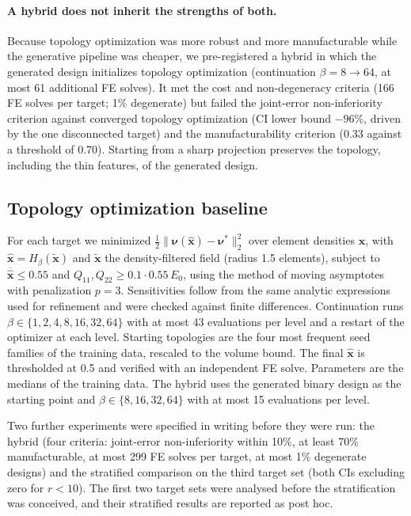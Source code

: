 \paragraph{A hybrid does not inherit the strengths of both.}
Because topology optimization was more robust and more manufacturable while
the generative pipeline was cheaper, we pre-registered a hybrid in which the
generated design initializes topology optimization (continuation
$\beta=8\to64$, at most 61 additional FE solves). It met the cost and
non-degeneracy criteria (166 FE solves per target; 1\% degenerate) but
failed the joint-error non-inferiority criterion against converged
topology optimization (CI lower bound $-96\%$, driven by the one
disconnected target) and the manufacturability criterion (0.33 against a
threshold of 0.70). Starting from a sharp projection preserves the topology,
including the thin features, of the generated design.

\subsection{Topology optimization baseline}
For each target we minimized
$\tfrac12\lVert\boldsymbol\nu(\hat{\mathbf x})-\boldsymbol\nu^{*}\rVert_2^2$
over element densities $\mathbf x$, with $\hat{\mathbf x}=H_\beta(\tilde{\mathbf x})$
and $\tilde{\mathbf x}$ the density-filtered field (radius 1.5 elements),
subject to $\overline{\hat{\mathbf x}}\le0.55$ and $Q_{11},Q_{22}\ge0.1\cdot0.55\,E_0$,
using the method of moving asymptotes \citep{svanberg1987mma} with penalization
$p=3$. Sensitivities follow from the same analytic expressions used for
refinement and were checked against finite differences. Continuation runs
$\beta\in\{1,2,4,8,16,32,64\}$ with at most 43 evaluations per level and a
restart of the optimizer at each level. Starting topologies are the four
most frequent seed families of the training data, rescaled to the volume
bound. The final $\hat{\mathbf x}$ is thresholded at 0.5 and verified with an
independent FE solve. Parameters are the medians of the training data.
The hybrid uses the generated binary design as the starting point and
$\beta\in\{8,16,32,64\}$ with at most 15 evaluations per level.

Two further experiments were specified in writing before they were run: the
hybrid (four criteria: joint-error non-inferiority within 10\%, at least 70\%
manufacturable, at most 299 FE solves per target, at most 1\% degenerate
designs) and the stratified comparison on the third target set (both CIs
excluding zero for $r<10$). The first two target sets were analysed before
the stratification was conceived, and their stratified results are reported
as post hoc.

